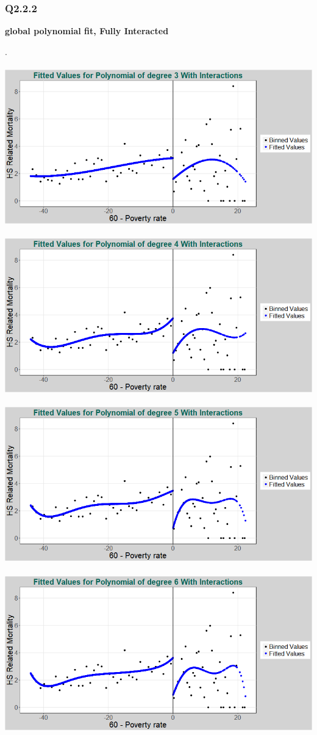 \documentclass[11pt]{article}
\begin{document}
\subsubsection{Q2.2.2}


\begin{center}
	\centering
	\textbf{global polynomial fit, Fully Interacted }\par\medskip
	\scalebox{1}{
		
	}
\end{center}
 .
\\ \\ 

\includegraphics[width=.8\linewidth]{plot_222_poly_3.png}
\\ \\
\includegraphics[width=.8\linewidth]{plot_222_poly_4.png}
\\ \\
\includegraphics[width=.8\linewidth]{plot_222_poly_5.png}
\\ \\
\includegraphics[width=.8\linewidth]{plot_222_poly_6.png}
\end{document}

